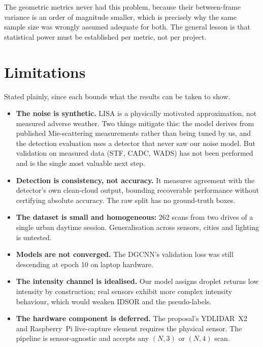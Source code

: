 \documentclass[11pt,a4paper]{article}
\begin{document}
The geometric metrics never had this problem, because their between-frame
variance is an order of magnitude smaller, which is precisely why the same sample
size was wrongly assumed adequate for both. The general lesson is that
statistical power must be established per metric, not per project.

\section{Limitations}

Stated plainly, since each bounds what the results can be taken to show.

\begin{itemize}
\item \textbf{The noise is synthetic.} LISA is a physically motivated
approximation, not measured adverse weather. Two things mitigate this: the
model derives from published Mie-scattering measurements rather than being
tuned by us, and the detection evaluation uses a detector that never saw our
noise model. But validation on measured data (STF, CADC, WADS) has not
been performed and is the single most valuable next step.
\item \textbf{Detection is consistency, not accuracy.} It measures agreement
with the detector's own clean-cloud output, bounding recoverable performance
without certifying absolute accuracy. The raw split has no ground-truth boxes.
\item \textbf{The dataset is small and homogeneous:} 262 scans from two
drives of a single urban daytime session. Generalisation across sensors,
cities and lighting is untested.
\item \textbf{Models are not converged.} The DGCNN's validation loss was still
descending at epoch 10 on laptop hardware.
\item \textbf{The intensity channel is idealised.} Our model assigns droplet
returns low intensity by construction; real sensors exhibit more complex
intensity behaviour, which would weaken IDSOR and the pseudo-labels.
\item \textbf{The hardware component is deferred.} The proposal's YDLIDAR~X2
and Raspberry~Pi live-capture element requires the physical sensor. The
pipeline is sensor-agnostic and accepts any $(N,3)$ or $(N,4)$ scan.
\end{itemize}

\end{document}
